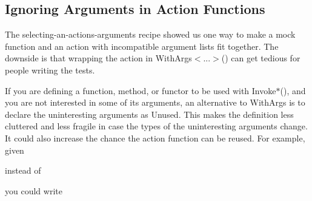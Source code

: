 \subsection*{Ignoring Arguments in Action Functions}

The selecting-\/an-\/action\textquotesingle{}s-\/arguments recipe showed us one way to make a mock function and an action with incompatible argument lists fit together. The downside is that wrapping the action in {\ttfamily With\+Args$<$...$>$()} can get tedious for people writing the tests.

If you are defining a function, method, or functor to be used with {\ttfamily Invoke$\ast$()}, and you are not interested in some of its arguments, an alternative to {\ttfamily With\+Args} is to declare the uninteresting arguments as {\ttfamily Unused}. This makes the definition less cluttered and less fragile in case the types of the uninteresting arguments change. It could also increase the chance the action function can be reused. For example, given


\begin{DoxyCode}{0}
\end{DoxyCode}


instead of


\begin{DoxyCode}{0}
\DoxyCodeLine{}
\DoxyCodeLine{\}}
\DoxyCodeLine{}
\DoxyCodeLine{\}}
\DoxyCodeLine{}
\end{DoxyCode}


you could write


\begin{DoxyCode}{0}
\DoxyCodeLine{}
\DoxyCodeLine{\}}
\DoxyCodeLine{}
\end{DoxyCode}


